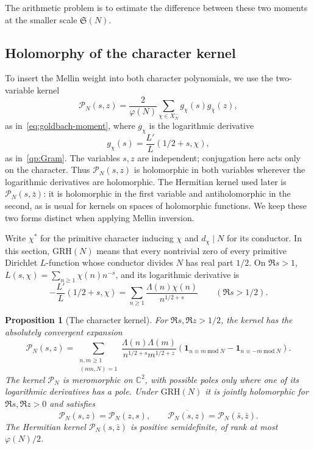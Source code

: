 \documentclass[12pt,a4paper]{amsart}
\numberwithin{equation}{section}
\def\ge{\geqslant}
\theoremstyle{plain}
\newtheorem{proposition}{Proposition}[section]
\theoremstyle{definition}
\theoremstyle{remark}
\begin{document}
The arithmetic problem is to estimate the difference between these
two moments at the smaller scale $\mathfrak S(N)$.

\subsection{Holomorphy of the character kernel}
\label{proof:v3:sec-geometry}\label{proof:v7:correlation-residual}

To insert the Mellin weight into both character polynomials, we use
the two-variable kernel
\[
 \mathscr P_N(s,z)=\frac2{\varphi(N)}\sum_{\chi\in X_N^-}
                    g_\chi(s)g_{\bar\chi}(z),
\]
as in~\eqref{eq:goldbach-moment},
where $g_\chi$ is the logarithmic derivative
\[
 g_\chi(s)=\frac{L'}L(1/2+s,\chi),
\]
as in~\eqref{qp:Gram}.
The variables $s,z$ are independent; conjugation here acts only on
the character. Thus $\mathscr P_N(s,z)$ is holomorphic in both
variables wherever the logarithmic derivatives are holomorphic.
The Hermitian kernel used later is $\mathscr P_N(s,\bar z)$:
it is holomorphic in the first variable and antiholomorphic in
the second, as is usual for kernels on spaces of holomorphic functions. We keep these two
forms distinct when applying Mellin inversion.

Write $\chi^*$ for the primitive character inducing $\chi$ and
$d_\chi\mid N$ for its conductor. In this section,
$\mathrm{GRH}(N)$ means that every nontrivial zero of every
primitive Dirichlet $L$-function whose conductor divides $N$
has real part $1/2$. On $\Re s>1$,
$L(s,\chi)=\sum_{n\ge1}\chi(n)n^{-s}$, and its logarithmic derivative is
\[
 -\frac{L'}L(1/2+s,\chi)
 =\sum_{n\ge1}\frac{\Lambda(n)\chi(n)}{n^{1/2+s}}
 \qquad(\Re s>1/2).
\]

\begin{proposition}[The character kernel]\label{proof:v3:kernel-holomorphy}
For $\Re s,\Re z>1/2$, the kernel has the absolutely convergent
expansion
\begin{equation}\label{proof:dir:kernel-expansion}
 \mathscr P_N(s,z)=
 \sum_{\substack{n,m\ge1\\(nm,N)=1}}
 \frac{\Lambda(n)\Lambda(m)}{n^{1/2+s}m^{1/2+z}}
 \left(\mathbf1_{n\equiv m\ \mathrm{mod}\ N}
              -\mathbf1_{n\equiv-m\ \mathrm{mod}\ N}\right).
\end{equation}
The kernel $\mathscr P_N$ is meromorphic on $\mathbb C^2$, with
possible poles only where one of its logarithmic derivatives has a
pole. Under $\mathrm{GRH}(N)$ it is jointly holomorphic for
$\Re s,\Re z>0$ and satisfies
\begin{equation}\label{proof:v3:kernel-symmetries}
 \mathscr P_N(s,z)=\mathscr P_N(z,s),\qquad
 \overline{\mathscr P_N(s,z)}=\mathscr P_N(\bar s,\bar z).
\end{equation}
The Hermitian kernel $\mathscr P_N(s,\bar z)$ is positive
semidefinite, of rank at most $\varphi(N)/2$.
\end{proposition}
\end{document}

